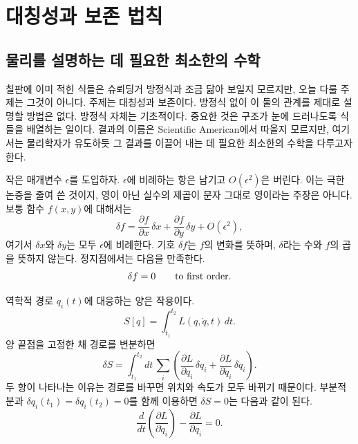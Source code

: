 \chapter{대칭성과 보존 법칙}


\section{물리를 설명하는 데 필요한 최소한의 수학}

칠판에 이미 적힌 식들은 슈뢰딩거 방정식과 조금 닮아 보일지 모르지만, 오늘 다룰 주제는 그것이 아니다. 주제는 대칭성과 보존이다. 방정식 없이 이 둘의 관계를 제대로 설명할 방법은 없다. 방정식 자체는 기초적이다. 중요한 것은 구조가 눈에 드러나도록 식들을 배열하는 일이다. 결과의 이름은 Scientific American에서 따올지 모르지만, 여기서는 물리학자가 유도하듯 그 결과를 이끌어 내는 데 필요한 최소한의 수학을 다루고자 한다.

작은 매개변수 \(\epsilon\)를 도입하자. \(\epsilon\)에 비례하는 항은 남기고 \(O(\epsilon^2)\)은 버린다. 이는 극한 논증을 줄여 쓴 것이지, 영이 아닌 실수의 제곱이 문자 그대로 영이라는 주장은 아니다. 보통 함수 \(f(x,y)\)에 대해서는
\begin{equation}
  \delta f
  =\frac{\partial f}{\partial x}\,\delta x
   +\frac{\partial f}{\partial y}\,\delta y
   +O(\epsilon^2),
  \label{eq:first-variation-f}
\end{equation}
여기서 \(\delta x\)와 \(\delta y\)는 모두 \(\epsilon\)에 비례한다. 기호 \(\delta f\)는 \(f\)의 변화를 뜻하며, \(\delta\)라는 수와 \(f\)의 곱을 뜻하지 않는다. 정지점에서는 다음을 만족한다.
\begin{equation}
  \delta f=0
  \qquad\hbox{to first order.}
  \label{eq:stationary-f}
\end{equation}

역학적 경로 \(q_i(t)\)에 대응하는 양은 작용이다.
\begin{equation}
  S[q]=\int_{t_1}^{t_2}L(q,\dot q,t)\,dt.
  \label{eq:action-l4}
\end{equation}
양 끝점을 고정한 채 경로를 변분하면
\begin{equation}
  \delta S
  =\int_{t_1}^{t_2}dt\,
   \sum_i\left(
     \frac{\partial L}{\partial q_i}\,\delta q_i
     +\frac{\partial L}{\partial\dot q_i}\,\delta\dot q_i
   \right).
  \label{eq:action-variation-l4}
\end{equation}
두 항이 나타나는 이유는 경로를 바꾸면 위치와 속도가 모두 바뀌기 때문이다. 부분적분과
\(\delta q_i(t_1)=\delta q_i(t_2)=0\)를 함께 이용하면 \(\delta S=0\)는 다음과 같이 된다.
\begin{equation}
  \frac{d}{dt}\left(\frac{\partial L}{\partial\dot q_i}\right)
  -\frac{\partial L}{\partial q_i}=0.
  \label{eq:el-l4}
\end{equation}

